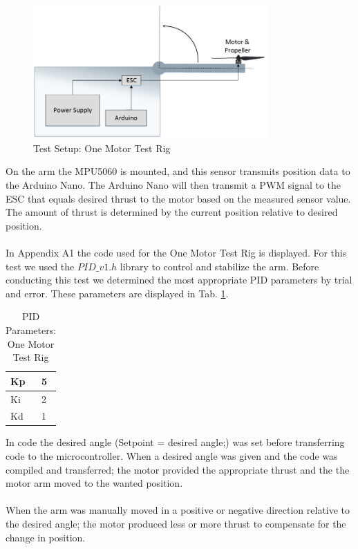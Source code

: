 \begin{figure}[H]
    \centering
    \includegraphics[width = 0.8\textwidth]{VAPIQ-PICTURES/TestSetup1}
    \caption{Test Setup: One Motor Test Rig}
    \label{fig:onemotor}
\end{figure}

On the arm the MPU5060 is mounted, and this sensor transmits position data to the Arduino Nano. The Arduino Nano will then transmit a PWM signal to the ESC that equals desired thrust to the motor based on the measured sensor value. The amount of thrust is determined by the current position relative to desired position. 
\\\\
In Appendix A1 the code used for the One Motor Test Rig is displayed. For this test we used the $PID\_v1.h$ library to control and stabilize the arm. Before conducting this test we determined the most appropriate PID parameters by trial and error. These parameters are displayed in Tab. \ref{tab:tabt2}.
\begin {table}[H]
    \begin{center}
    \caption {PID Parameters: One Motor Test Rig} 
    \label{tab:tabt2} 
    \begin{tabular}{|l|l|}\hline 
        Kp         & 5  \\ \hline
        Ki         & 2   \\ \hline
        Kd         & 1  \\ \hline
    \end{tabular}
    \end{center}
\end{table}

In code the desired angle (Setpoint = desired angle;) was set before transferring code to the microcontroller. When a desired angle was given and the code was compiled and transferred; the motor provided the appropriate thrust and the the motor arm moved to the wanted position. 
\\\\
When the arm was manually moved in a positive or negative direction relative to the desired angle; the motor produced less or more thrust to compensate for the change in position. 


